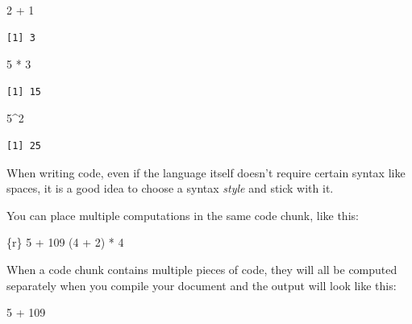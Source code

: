 \documentclass[
  letterpaper,
  DIV=11,
  numbers=noendperiod]{scrreprt}
\newenvironment{Shaded}{\begin{snugshade}}{\end{snugshade}}
\newcommand{\DecValTok}[1]{\textcolor[rgb]{0.68,0.00,0.00}{#1}}
\newcommand{\InformationTok}[1]{\textcolor[rgb]{0.37,0.37,0.37}{#1}}
\newcommand{\SpecialCharTok}[1]{\textcolor[rgb]{0.37,0.37,0.37}{#1}}
\begin{document}
\begin{Shaded}
\begin{Highlighting}[]
\DecValTok{2} \SpecialCharTok{+} \DecValTok{1}
\end{Highlighting}
\end{Shaded}

\begin{verbatim}
[1] 3
\end{verbatim}

\begin{Shaded}
\begin{Highlighting}[]
\DecValTok{5} \SpecialCharTok{*} \DecValTok{3}
\end{Highlighting}
\end{Shaded}

\begin{verbatim}
[1] 15
\end{verbatim}

\begin{Shaded}
\begin{Highlighting}[]
\DecValTok{5}\SpecialCharTok{\^{}}\DecValTok{2}
\end{Highlighting}
\end{Shaded}

\begin{verbatim}
[1] 25
\end{verbatim}

When writing code, even if the language itself doesn't require certain
syntax like spaces, it is a good idea to choose a syntax \emph{style}
and stick with it.

You can place multiple computations in the same code chunk, like this:

\begin{Shaded}
\begin{Highlighting}[]
\InformationTok{\textasciigrave{}\textasciigrave{}\textasciigrave{}\{r\}}
\InformationTok{5 + 109}
\InformationTok{(4 + 2) * 4}
\InformationTok{\textasciigrave{}\textasciigrave{}\textasciigrave{}}
\end{Highlighting}
\end{Shaded}

When a code chunk contains multiple pieces of code, they will all be
computed separately when you compile your document and the output will
look like this:

\begin{Shaded}
\begin{Highlighting}[]
\DecValTok{5} \SpecialCharTok{+} \DecValTok{109}
\end{Highlighting}
\end{Shaded}
\end{document}
